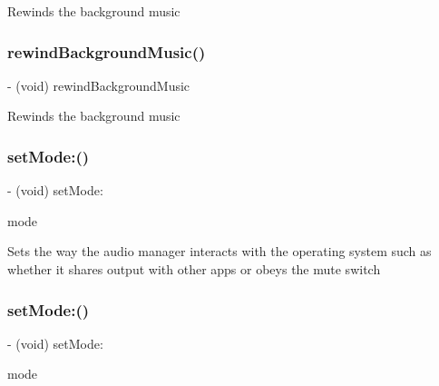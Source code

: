 Rewinds the background music \mbox{\label{interfaceCDAudioManager_a98e99a2b9eabcf89ad7419f6f809c65a}} 
\subsubsection{\texorpdfstring{rewind\+Background\+Music()}{rewindBackgroundMusic()}\hspace{0.1cm}{\footnotesize\ttfamily [4/4]}}
{\footnotesize\ttfamily -\/ (void) rewind\+Background\+Music \begin{DoxyParamCaption}{ }\end{DoxyParamCaption}}

Rewinds the background music \mbox{\label{interfaceCDAudioManager_a72fd182d62cc75dfa3701da4a5d97346}} 
\subsubsection{\texorpdfstring{set\+Mode\+:()}{setMode:()}\hspace{0.1cm}{\footnotesize\ttfamily [1/4]}}
{\footnotesize\ttfamily -\/ (void) set\+Mode\+: \begin{DoxyParamCaption}\item[{(t\+Audio\+Manager\+Mode)}]{mode }\end{DoxyParamCaption}}

Sets the way the audio manager interacts with the operating system such as whether it shares output with other apps or obeys the mute switch \mbox{\label{interfaceCDAudioManager_a72fd182d62cc75dfa3701da4a5d97346}} 
\subsubsection{\texorpdfstring{set\+Mode\+:()}{setMode:()}\hspace{0.1cm}{\footnotesize\ttfamily [2/4]}}
{\footnotesize\ttfamily -\/ (void) set\+Mode\+: \begin{DoxyParamCaption}\item[{(t\+Audio\+Manager\+Mode)}]{mode }\end{DoxyParamCaption}}

